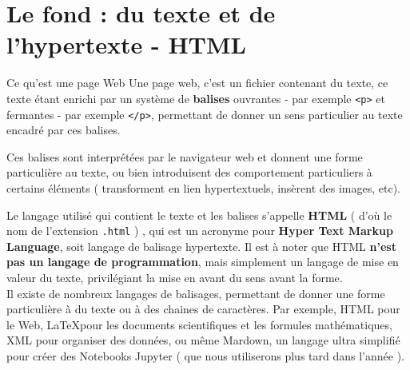 \documentclass[a4paper,12pt]{article}
\begin{document}
\section{Le fond : du texte et de l'hypertexte - HTML}
\begin{info}{Ce qu'est une page Web}
\noindent Une page web, c'est un fichier contenant du texte, ce texte étant enrichi par un système de \textbf{balises} ouvrantes - par exemple \texttt{<p>} et fermantes - par exemple \texttt{</p>}, permettant de donner un sens particulier au texte encadré par ces balises.

\noindent Ces balises sont interprétées par le navigateur web et donnent une forme particulière au texte, ou bien introduisent des comportement particuliers à certains éléments ( transforment en lien hypertextuels, insèrent des images, etc).

\noindent Le langage utilisé qui contient le texte et les balises s'appelle \textbf{HTML} ( d'où le nom de l'extension \texttt{.html} ) , qui est un acronyme pour \textbf{Hyper Text Markup Language}, soit langage de balisage hypertexte. Il est à noter que HTML \textbf{n'est pas un langage de programmation}, mais simplement un langage de mise en valeur du texte, privilégiant la mise en avant du sens avant la forme.\\

\noindent Il existe de nombreux langages de balisages, permettant de donner une forme particulière à du texte ou à des chaines de caractères. Par exemple, HTML pour le Web, \LaTeX pour les documents scientifiques et les formules mathématiques, XML pour organiser des données, ou même Mardown, un langage ultra simplifié pour créer des Notebooks Jupyter ( que nous utiliserons plus tard dans l'année ).
\end{info}
\end{document}
